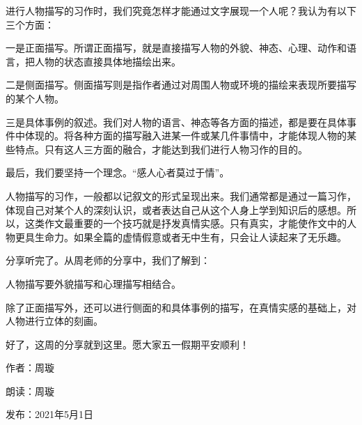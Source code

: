 进行人物描写的习作时，我们究竟怎样才能通过文字展现一个人呢？我认为有以下三个方面：



一是正面描写。所谓正面描写，就是直接描写人物的外貌、神态、心理、动作和语言，把人物的状态直接具体地描绘出来。



二是侧面描写。侧面描写则是指作者通过对周围人物或环境的描绘来表现所要描写的某个人物。



三是具体事例的叙述。我们对人物的语言、神态等各方面的描述，都是要在具体事件中体现的。将各种方面的描写融入进某一件或某几件事情中，才能体现人物的某些特点。只有这人三方面的融合，才能达到我们进行人物习作的目的。



最后，我们要坚持一个理念。“感人心者莫过于情”。



人物描写的习作，一般都以记叙文的形式呈现出来。我们通常都是通过一篇习作，体现自己对某个人的深刻认识，或者表达自己从这个人身上学到知识后的感想。所以，这类作文最重要的一个技巧就是抒发真情实感。只有真实，才能使作文中的人物更具生命力。如果全篇的虚情假意或者无中生有，只会让人读起来了无乐趣。





分享听完了。从周老师的分享中，我们了解到：



人物描写要外貌描写和心理描写相结合。



除了正面描写外，还可以进行侧面的和具体事例的描写，在真情实感的基础上，对人物进行立体的刻画。



好了，这周的分享就到这里。愿大家五一假期平安顺利！




\vspace{10pt}


作者：周璇

朗读：周璇

发布：2021年5月1日







\vspace{10pt}

\hline


